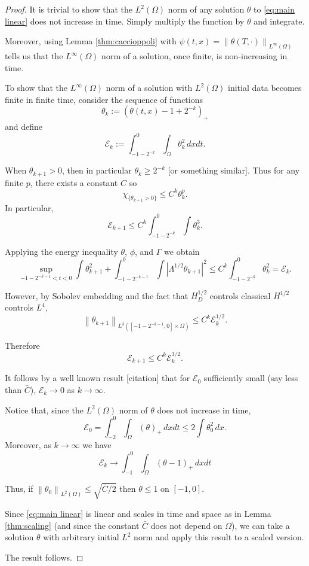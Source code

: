 \documentclass[11pt]{amsart}
\theoremstyle{remark}
\theoremstyle{definition}
\newcommand{\E}{\mathcal{E}}
\newcommand{\norm}[1]{\left\lVert#1\right\rVert}
\newcommand{\abs}[1]{\left\lvert #1 \right\rvert}
\newcommand{\indic}[1]{\chi_{\{#1\}}}
\begin{document}
\begin{proof}
It is trivial to show that the $L^2(\Omega)$ norm of any solution $\theta$ to \eqref{eq:main linear} does not increase in time.  Simply multiply the function by $\theta$ and integrate.  

Moreover, using Lemma \ref{thm:caccioppoli} with $\psi(t,x) = \norm{\theta(T,\cdot)}_{L^\infty(\Omega)}$ tells us that the $L^\infty(\Omega)$ norm of a solution, once finite, is non-increasing in time.

To show that the $L^\infty(\Omega)$ norm of a solution with $L^2(\Omega)$ initial data becomes finite in finite time, consider the sequence of functions
\[ \theta_k := (\theta(t,x) - 1 + 2^{-k})_+ \]
and define
\[ \E_k := \int_{-1-2^{-k}}^0 \int_\Omega \theta_k^2 \,dxdt. \]

When $\theta_{k+1}>0$, then in particular $\theta_k \geq 2^{-k}$ [or something similar].  Thus for any finite $p$, there exists a constant $C$ so
\[ \indic{\theta_{k+1}>0} \leq C^k \theta_k^p. \]
In particular,
\[ \E_{k+1} \leq C^k \int_{-1-2^{-k}}^0 \int \theta_k^3. \]

Applying the energy inequality $\theta$, $\phi$, and $\Gamma$ we obtain
\[ \sup_{-1-2^{-k-1}<t<0} \int \theta_{k+1}^2 + \int_{-1-2^{-k-1}}^0 \int \abs{\Lambda^{1/2}\theta_{k+1}}^2 \leq C^k \int_{-1-2^{-k}}^0 \theta_k^2 = \E_k. \]

However, by Sobolev embedding and the fact that $H_D^{1/2}$ controls classical $H^{1/2}$ controls $L^4$,
\[ \norm{\theta_{k+1}}_{L^3([-1-2^{-k-1},0]\times\Omega)} \leq C^k \E_k^{1/2}. \]

Therefore
\[ \E_{k+1} \leq C^k \E_k^{3/2}. \]

It follows by a well known result [citation] that for $\E_0$ sufficiently small (say less than $\bar{C}$), $\E_k \to 0$ as $k \to \infty$.  

Notice that, since the $L^2(\Omega)$ norm of $\theta$ does not increase in time,
\[ \E_0 = \int_{-2}^0 \int_\Omega (\theta)_+ \,dxdt \leq 2 \int \theta_0^2 \,dx . \]
Moreover, as $k \to \infty$ we have
\[ \E_k \to \int_{-1}^0 \int_\Omega (\theta - 1)_+ \,dxdt \]

Thus, if $\norm{\theta_0}_{L^2(\Omega)} \leq \sqrt{\bar{C}/2}$ then $\theta \leq 1$ on $[-1,0]$.  

Since \eqref{eq:main linear} is linear and scales in time and space as in Lemma \ref{thm:scaling} (and since the constant $\bar{C}$ does not depend on $\Omega$), we can take a solution $\theta$ with arbitrary initial $L^2$ norm and apply this result to a scaled version. 

The result follows.  
\end{proof}
\end{document}
